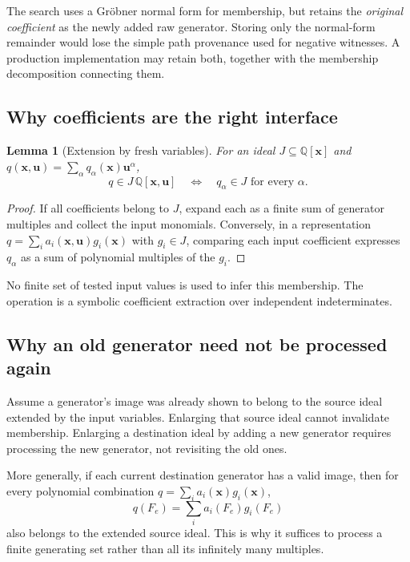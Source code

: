 \documentclass[11pt,letterpaper]{article}
\newtheorem{lemma}[theorem]{Lemma}
\theoremstyle{definition}
\newcommand{\Q}{\mathbb Q}
\begin{document}
The search uses a Gr\"obner normal form for membership, but retains the
\emph{original coefficient} as the newly added raw generator. Storing only the
normal-form remainder would lose the simple path provenance used for negative
witnesses. A production implementation may retain both, together with the
membership decomposition connecting them.

\subsection{Why coefficients are the right interface}
\begin{lemma}[Extension by fresh variables]\label{lem:coeff}
For an ideal $J\subseteq\Q[\bm x]$ and
$q(\bm x,\bm u)=\sum_\alpha q_\alpha(\bm x)\bm u^\alpha$,
\[
 q\in J\,\Q[\bm x,\bm u]
 \quad\Longleftrightarrow\quad q_\alpha\in J\text{ for every }\alpha.
\]
\end{lemma}
\begin{proof}
If all coefficients belong to $J$, expand each as a finite sum of generator
multiples and collect the input monomials. Conversely, in a representation
$q=\sum_i a_i(\bm x,\bm u)g_i(\bm x)$ with $g_i\in J$, comparing each input
coefficient expresses $q_\alpha$ as a sum of polynomial multiples of the $g_i$.
\end{proof}

No finite set of tested input values is used to infer this membership. The
operation is a symbolic coefficient extraction over independent indeterminates.

\subsection{Why an old generator need not be processed again}
Assume a generator's image was already shown to belong to the source ideal
extended by the input variables. Enlarging that source ideal cannot invalidate
membership. Enlarging a destination ideal by adding a new generator requires
processing the new generator, not revisiting the old ones.

More generally, if each current destination generator has a valid image, then
for every polynomial combination
$q=\sum_i a_i(\bm x)g_i(\bm x)$,
\[
 q(F_e)=\sum_i a_i(F_e)g_i(F_e)
\]
also belongs to the extended source ideal. This is why it suffices to process a
finite generating set rather than all its infinitely many multiples.
\end{document}
